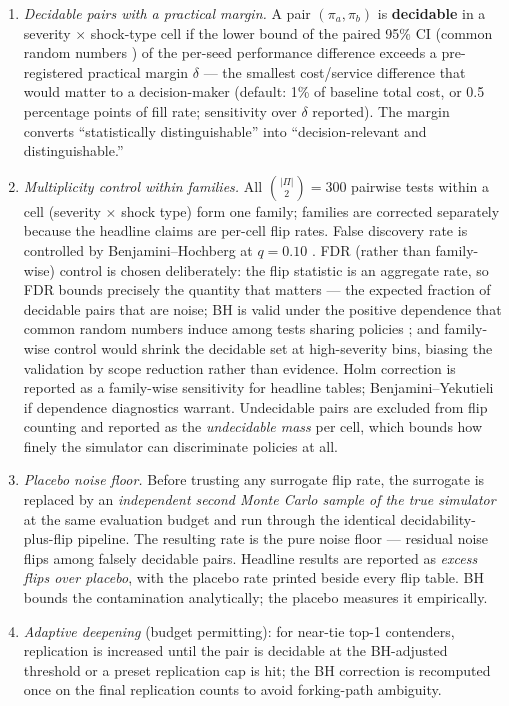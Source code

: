 \documentclass[12pt,a4paper]{article}
\begin{document}
\begin{enumerate}
\item \emph{Decidable pairs with a practical margin.} A pair $(\pi_a,\pi_b)$ is \textbf{decidable} in a severity $\times$ shock-type cell if the lower bound of the paired 95\% CI (common random numbers \citep{law2015}) of the per-seed performance difference exceeds a pre-registered practical margin $\delta$ --- the smallest cost/service difference that would matter to a decision-maker (default: 1\% of baseline total cost, or 0.5 percentage points of fill rate; sensitivity over $\delta$ reported). The margin converts ``statistically distinguishable'' into ``decision-relevant and distinguishable.''
\item \emph{Multiplicity control within families.} All $\binom{|\Pi|}{2} = 300$ pairwise tests within a cell (severity $\times$ shock type) form one family; families are corrected separately because the headline claims are per-cell flip rates. False discovery rate is controlled by Benjamini--Hochberg at $q=0.10$ \citep{benjamini1995,benjamini2001}. FDR (rather than family-wise) control is chosen deliberately: the flip statistic is an aggregate rate, so FDR bounds precisely the quantity that matters --- the expected fraction of decidable pairs that are noise; BH is valid under the positive dependence that common random numbers induce among tests sharing policies \citep{benjamini2001}; and family-wise control would shrink the decidable set at high-severity bins, biasing the validation by scope reduction rather than evidence. Holm correction \citep{holm1979} is reported as a family-wise sensitivity for headline tables; Benjamini--Yekutieli if dependence diagnostics warrant. Undecidable pairs are excluded from flip counting and reported as the \emph{undecidable mass} per cell, which bounds how finely the simulator can discriminate policies at all.
\item \emph{Placebo noise floor.} Before trusting any surrogate flip rate, the surrogate is replaced by an \emph{independent second Monte Carlo sample of the true simulator} at the same evaluation budget and run through the identical decidability-plus-flip pipeline. The resulting rate is the pure noise floor --- residual noise flips among falsely decidable pairs. Headline results are reported as \emph{excess flips over placebo}, with the placebo rate printed beside every flip table. BH bounds the contamination analytically; the placebo measures it empirically.
\item \emph{Adaptive deepening} (budget permitting): for near-tie top-1 contenders, replication is increased until the pair is decidable at the BH-adjusted threshold or a preset replication cap is hit; the BH correction is recomputed once on the final replication counts to avoid forking-path ambiguity.
\end{enumerate}
\end{document}
